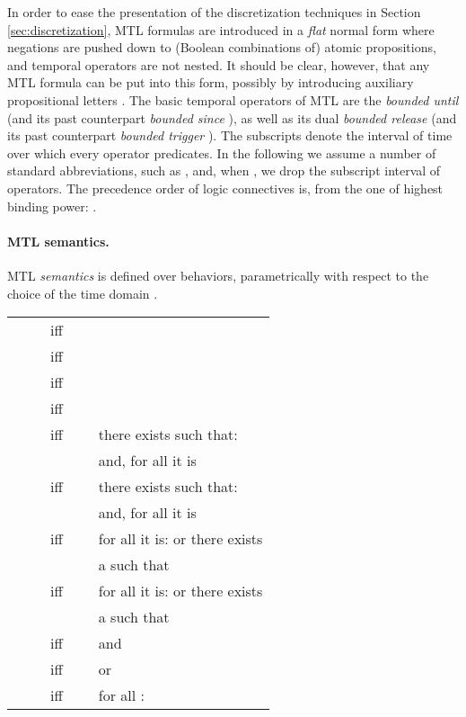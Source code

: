 \documentclass[a4paper]{article}
\theoremstyle{plain}
\theoremstyle{definition}
\begin{document}
In order to ease the presentation of the discretization techniques in Section \ref{sec:discretization}, MTL formulas are introduced in a \emph{flat} normal form where negations are pushed down to (Boolean combinations of) atomic propositions, and temporal operators are not nested.
It should be clear, however, that any MTL formula can be put into this form, possibly by introducing auxiliary propositional letters \cite{DMP06,Fur07}.
The basic temporal operators of MTL are the \emph{bounded until}  (and its past counterpart \emph{bounded since} ), as well as its dual \emph{bounded release}  (and its past counterpart \emph{bounded trigger} ).
The subscripts  denote the interval of time over which every operator predicates.
In the following we assume a number of standard abbreviations, such as , and, when , we drop the subscript interval of operators.
The precedence order of logic connectives is, from the one of highest binding power: .



\paragraph{MTL semantics.}
MTL \emph{semantics} is defined over behaviors, parametrically with respect to the choice of the time domain .\\
\begin{tabular}{l c l}
   & \ \ \ iff\ \ \ &   \\
   & \ \ \ iff\ \ \ &   \\

   & \ \ \ iff\ \ \ &   \\
   & \ \ \ iff\ \ \ &   \\

   & \ \ \ iff\ \ \ &
            there exists  such that:   \\
  &  &      and, for all  it is   \\

   & \ \ \ iff\ \ \ &
            there exists  such that:   \\
  &  &      and, for all  it is   \\

   & \ \ \ iff\ \ \ &
            for all  it is:  or there exists \\
  &  &       a  such that   \\

   & \ \ \ iff\ \ \ &
            for all  it is:  or there exists \\
  &  &       a  such that   \\

    & \ \ \ iff\ \ \ &  and   \\

    & \ \ \ iff\ \ \ &  or   \\

    & \ \ \ iff\ \ \ &  for all : 
\end{tabular}
\end{document}
